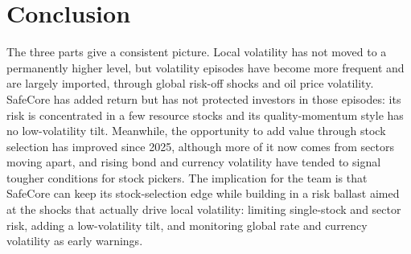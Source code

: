 \documentclass[11pt,preprint]{elsarticle}
\numberwithin{equation}{section}
\numberwithin{figure}{section}
\numberwithin{table}{section}
\begin{document}
\section{\texorpdfstring{Conclusion
\label{Conclusion}}{Conclusion }}\label{conclusion}

The three parts give a consistent picture. Local volatility has not
moved to a permanently higher level, but volatility episodes have become
more frequent and are largely imported, through global risk-off shocks
and oil price volatility. SafeCore has added return but has not
protected investors in those episodes: its risk is concentrated in a few
resource stocks and its quality-momentum style has no low-volatility
tilt. Meanwhile, the opportunity to add value through stock selection
has improved since 2025, although more of it now comes from sectors
moving apart, and rising bond and currency volatility have tended to
signal tougher conditions for stock pickers. The implication for the
team is that SafeCore can keep its stock-selection edge while building
in a risk ballast aimed at the shocks that actually drive local
volatility: limiting single-stock and sector risk, adding a
low-volatility tilt, and monitoring global rate and currency volatility
as early warnings.


\end{document}
